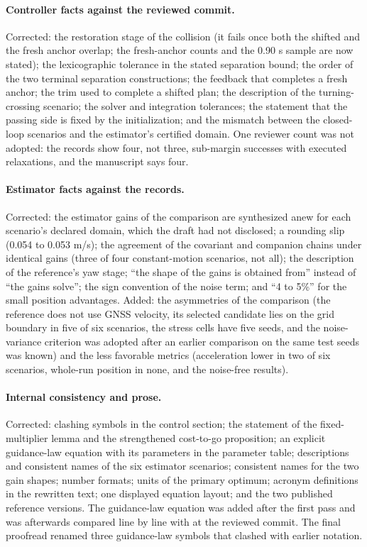 \documentclass[11pt]{article}
\begin{document}
\paragraph{Controller facts against the reviewed commit.} Corrected: the
restoration stage of the collision (it fails once both the shifted and the
fresh anchor overlap; the fresh-anchor counts and the 0.90 s sample are now
stated); the lexicographic tolerance in the stated separation bound; the
order of the two terminal separation constructions; the feedback that
completes a fresh anchor; the trim used to complete a shifted plan; the
description of the turning-crossing scenario; the solver and integration
tolerances; the statement that the passing side is fixed by the
initialization; and the mismatch between the closed-loop scenarios and the
estimator's certified domain. One reviewer count was not adopted: the
records show four, not three, sub-margin successes with executed
relaxations, and the manuscript says four.

\paragraph{Estimator facts against the records.} Corrected: the estimator
gains of the comparison are synthesized anew for each scenario's declared
domain, which the draft had not disclosed; a rounding slip (0.054 to
0.053 m/s); the agreement of the covariant and companion chains under
identical gains (three of four constant-motion scenarios, not all); the
description of the reference's yaw stage; ``the shape of the gains is
obtained from'' instead of ``the gains solve''; the sign convention of the
noise term; and ``4 to 5\%'' for the small position advantages. Added: the
asymmetries of the comparison (the reference does not use GNSS velocity,
its selected candidate lies on the grid boundary in five of six scenarios,
the stress cells have five seeds, and the noise-variance criterion was
adopted after an earlier comparison on the same test seeds was known) and
the less favorable metrics (acceleration lower in two of six scenarios,
whole-run position in none, and the noise-free results).

\paragraph{Internal consistency and prose.} Corrected: clashing symbols in
the control section; the statement of the fixed-multiplier lemma and the
strengthened cost-to-go proposition; an explicit guidance-law equation with
its parameters in the parameter table; descriptions and consistent names of
the six estimator scenarios; consistent names for the two gain shapes;
number formats; units of the primary optimum; acronym definitions in the
rewritten text; one displayed equation layout; and the two published
reference versions. The guidance-law equation was added after the first
pass and was afterwards compared line by line with
 at the reviewed commit. The
final proofread renamed three guidance-law symbols that clashed with
earlier notation.
\end{document}
